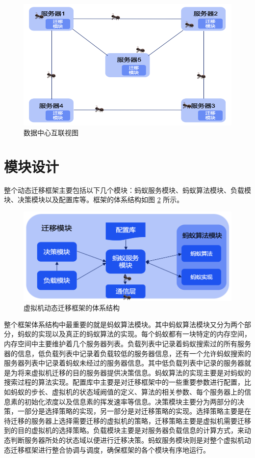 \begin{figure}[htbp]
  \centering
  \includegraphics{./Figure/IMG_Chap3_1.png}
  \caption{数据中心互联视图}\label{Fig:chap3_1}
\end{figure}

\section{模块设计}
整个动态迁移框架主要包括以下几个模块：蚂蚁服务模块、蚂蚁算法模块、负载模块、决策模块以及配置库等。框架的体系结构如图 \ref{Fig:chap3_2} 所示。

\begin{figure}[htbp]
  \centering
  \includegraphics{./Figure/IMG_Chap3_2.png}
  \caption{虚拟机动态迁移框架的体系结构}\label{Fig:chap3_2}
\end{figure}

整个框架体系结构中最重要的就是蚂蚁算法模块。其中蚂蚁算法模块又分为两个部分，蚂蚁的实现以及真正的蚂蚁算法的实现。每个蚂蚁都有一块特定的内存空间，内存空间中主要维护着几个服务器列表。负载列表中记录着蚂蚁搜索过的所有服务器的信息，低负载列表中记录着负载较低的服务器信息，还有一个允许蚂蚁搜索的服务器列表中记录着蚂蚁未经过的服务器信息。其中低负载列表中记录的服务器就是为将来虚拟机迁移的目的服务器提供决策信息。蚂蚁算法的实现主要是对蚂蚁的搜索过程的算法实现。配置库中主要是对迁移框架中的一些重要参数进行配置，比如蚂蚁的步长、虚拟机的状态域阙值的定义、算法的相关参数、每个服务器上的信息素的初始化浓度以及信息素的挥发速率等信息。决策模块主要分为两部分的决策，一部分是选择策略的实现，另一部分是对迁移策略的实现。选择策略主要是在待迁移的服务器上选择需要迁移的虚拟机的策略，迁移策略主要是虚拟机需要迁移到的目的虚拟机的选择策略。负载模块主要是对服务器负载信息的计算方式，来动态判断服务器所处的状态域以便进行迁移决策。蚂蚁服务模块则是对整个虚拟机动态迁移框架进行整合协调与调度，确保框架的各个模块有序地运行。

